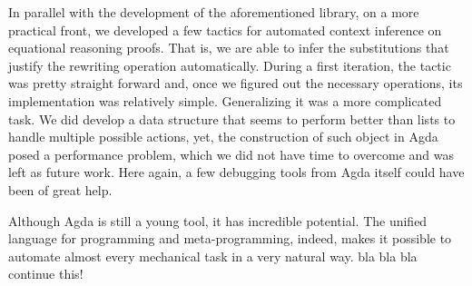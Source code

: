 In parallel with the development of the aforementioned library, on a more practical front,
we developed a few tactics for automated context inference on equational reasoning proofs.
That is, we are able to infer the substitutions that justify the rewriting operation automatically.
During a first iteration, the tactic was pretty straight forward and, once we figured out
the necessary  operations, its implementation was relatively simple.
Generalizing it was a more complicated task. We did develop a data structure that 
seems to perform better than lists to handle multiple possible actions, yet, the construction 
of such object in Agda posed a performance problem, which we did not have time to overcome 
and was left as future work. Here again, a few debugging tools from Agda itself could have been of great help.

Although Agda is still a young tool, it has incredible potential. The unified language for
programming and meta-programming, indeed, makes it possible to automate almost every mechanical 
task in a very natural way. { \color{blue} bla bla bla continue this! }

